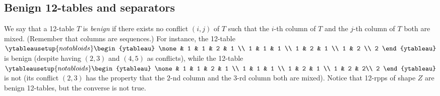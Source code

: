 \documentclass[numbers=enddot,12pt,final,onecolumn,notitlepage]{scrartcl}%
\theoremstyle{definition}
\begin{document}
\subsection{Benign 12-tables and separators}
\label{subsection:benign}
We say that a 12-table $T$ is \textit{benign} if there exists no conflict
$\left(  i,j\right)  $ of $T$ such that the $i$-th column of $T$ and the
$j$-th column of $T$ both are mixed. (Remember that columns are sequences.)
For instance, the 12-table $%
\ytableausetup{notabloids}
\begin{ytableau}
\none& 1 & 1 & 2 & 1 \\
1 & 1 & 1 \\
1 & 2 & 1 \\
1 & 2 \\
2
\end{ytableau}%
$ is benign (despite having $\left(  2,3\right)  $ and $\left(  4,5\right)  $
as conflicts), while the 12-table $%
\ytableausetup{notabloids}
\begin{ytableau}
\none& 1 & 1 & 2 & 1 \\
1 & 1 & 1 \\
1 & 2 & 1 \\
1 & 2 & 2\\
2
\end{ytableau}%
$ is not (its conflict $\left(  2,3\right)  $ has the property that the $2$-nd
column and the $3$-rd column both are mixed). Notice that 12-rpps of shape
$Z$ are benign 12-tables, but the converse is not true.
\end{document}
